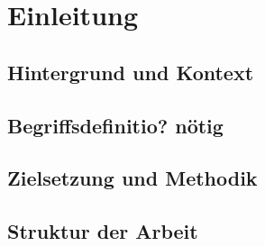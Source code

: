 \section{Einleitung}




\subsection{Hintergrund und Kontext}


\subsection{Begriffsdefinitio? nötig}

\subsection{Zielsetzung und Methodik}




\subsection{Struktur der Arbeit} %


